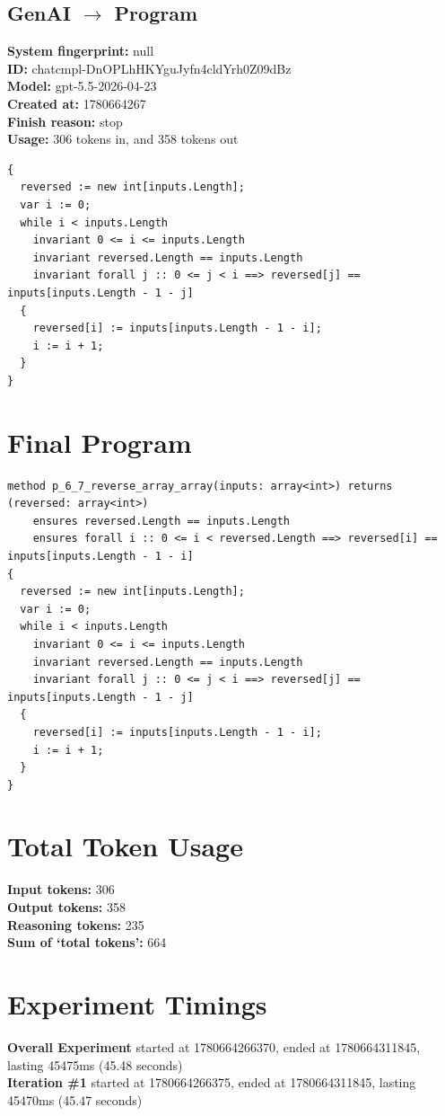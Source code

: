 \documentclass{article}
\begin{document}
\subsection*{GenAI $\rightarrow$ Program}
\textbf{System fingerprint: }null
\\\textbf{ID: }chatcmpl-DnOPLhHKYguJyfn4cldYrh0Z09dBz
\\\textbf{Model: }gpt-5.5-2026-04-23
\\\textbf{Created at: }1780664267
\\\textbf{Finish reason: }stop
\\\textbf{Usage: }306 tokens in, and 358 tokens out
\begin{lstlisting}
{
  reversed := new int[inputs.Length];
  var i := 0;
  while i < inputs.Length
    invariant 0 <= i <= inputs.Length
    invariant reversed.Length == inputs.Length
    invariant forall j :: 0 <= j < i ==> reversed[j] == inputs[inputs.Length - 1 - j]
  {
    reversed[i] := inputs[inputs.Length - 1 - i];
    i := i + 1;
  }
}
\end{lstlisting}
\section*{Final Program}
\begin{lstlisting}
method p_6_7_reverse_array_array(inputs: array<int>) returns (reversed: array<int>)
	ensures reversed.Length == inputs.Length
	ensures forall i :: 0 <= i < reversed.Length ==> reversed[i] == inputs[inputs.Length - 1 - i]
{
  reversed := new int[inputs.Length];
  var i := 0;
  while i < inputs.Length
    invariant 0 <= i <= inputs.Length
    invariant reversed.Length == inputs.Length
    invariant forall j :: 0 <= j < i ==> reversed[j] == inputs[inputs.Length - 1 - j]
  {
    reversed[i] := inputs[inputs.Length - 1 - i];
    i := i + 1;
  }
}
\end{lstlisting}
\section*{Total Token Usage}
\textbf{Input tokens: }306
\\\textbf{Output tokens: }358
\\\textbf{Reasoning tokens: }235
\\\textbf{Sum of `total tokens': }664
\section*{Experiment Timings}
\textbf{Overall Experiment} started at 1780664266370, ended at 1780664311845, lasting 45475ms (45.48 seconds)
\\\textbf{Iteration \#1} started at 1780664266375, ended at 1780664311845, lasting 45470ms (45.47 seconds)
\end{document}
